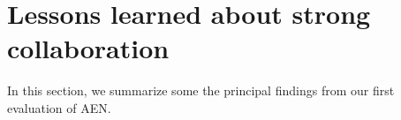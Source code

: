 

\section{Lessons learned about strong collaboration}

In this section, we summarize some the principal findings from our first
evaluation of AEN.  

